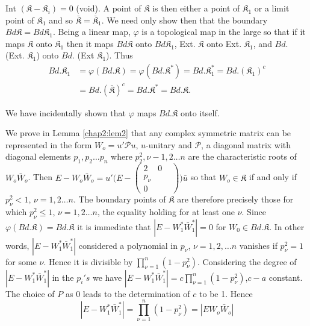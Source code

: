 Int $(\mathfrak{K}-\mathfrak{K}_i) = 0$ (void). A point of
$\mathfrak{K}$ is then either a point of $\mathfrak{K}_1$ or a limit
point of $\mathfrak{K}_1$ and so $\bar{\mathfrak{K}} =
\bar{\mathfrak{K}}_1$. We need only show then that the boundary  $Bd
\mathfrak{K} = Bd \mathfrak{K}_1$. Being a linear map, $\varphi$ is a
topological map in the large so that if it maps $\mathfrak{K}$ onto
$\mathfrak{K}_1$ then it maps $Bd \mathfrak{K}$ onto $Bd
\mathfrak{K}_1$, Ext. $\mathfrak{K}$ onto Ext. $\mathfrak{K}_1$, and
$Bd.$ (Ext. $\mathfrak{K}_1$) onto $Bd.$ (Ext $\mathfrak{K}_1$). Thus 
\begin{align*}
Bd .\mathfrak{K}_1 & = \varphi (Bd.\mathfrak{K})  = \varphi (Bd.
\mathfrak{K}^*) = Bd. \mathfrak{K}^*_1 = Bd. (\mathfrak{K}_1)^c\\ 
& = Bd .(\bar{\mathfrak{K}})^c = Bd. \mathfrak{K}^* = Bd. \mathfrak{K}.
\end{align*}

We have incidentally shown that $\varphi$ maps $Bd .\mathfrak{K}$ onto
itself. 

We prove in Lemma \ref{chap2:lem2} that any complex symmetric matrix can be
represented in the form $W_o = u' \mathcal{P}
u$, $u$-unitary and $\mathcal{P}$, a diagonal
matrix with diagonal elements  $p_1 , p_2 \dots
p_n$ where $p^2_2 ,\nu - 1,2 \dots n$ are the
characteristic roots of $W_o \bar{W}_o$. Then $E -W_o \bar{W}_o =
u' \bigg(E-\begin{pmatrix}  2 & 0 \\ p_\nu & \\ 0 &
&\end{pmatrix}\bigg) \bar{u} $ so that $W_o \in
\mathfrak{K}$ if and only if $p^2_\nu <1$, $\nu = 1,2 \dots n$. The boundary
points of $\mathfrak{K}$ are therefore precisely those for which $p^2_\nu
\le 1$, $\nu = 1,2 \ldots n$, the equality holding for at least one
$\nu$. Since $\varphi (Bd. \mathfrak{K}) = Bd .\mathfrak{K}$ it is
immediate that $|E - W^*_1 \bar{W}^*_1| = 0$ for $W_0 \in
Bd. \mathfrak{K}$. In other words, $|E - W^\ast_1 \bar{W}^\ast_1|$
considered a polynomial in
$p_\nu$, $\nu = 1,2,\dots n $ vanishes if $p^2_\nu =
1$ for some $\nu$. Hence it is divisible by $\prod\limits_{\nu = 1}^n
(1 - p^2_\nu)$. Considering the degree of $|E - W^*_1
\bar{W}^*_1|$ in the $p_i's$ we have $|E- W^*_1
\bar{W}^*_1| = c \prod\limits_{\nu=1}^n (1- p^2_\nu)$,\pageoriginale $c-a$
constant. The choice of $P$ as 0 leads to the determination of $c$
to be 1. Hence 
\begin{equation*}
|E- W^*_1 \bar{W}^*_1| = \prod\limits_{\nu=1}^n (1 - p^2_\nu) = |E W_o
\bar{W}_o| \tag{36}\label{eq36}   
\end{equation*}

